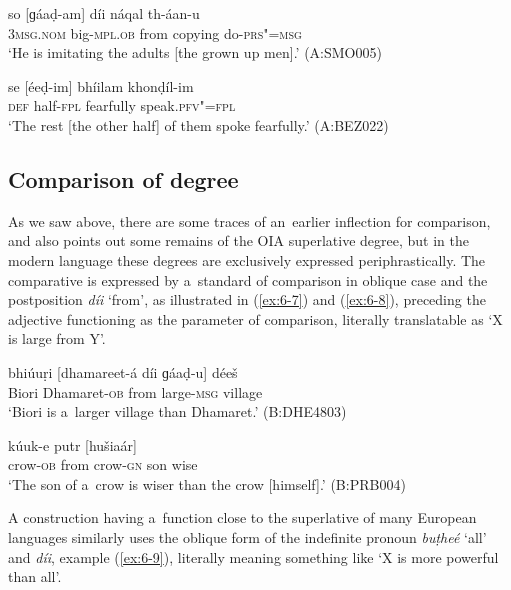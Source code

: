 {\begin{exe}
\ex
\label{ex:6-5}
\gll so [ɡáaḍ-am] díi náqal th-áan-u \\
\textsc{3msg.nom} big-\textsc{mpl.ob} from copying do-\textsc{prs"=msg} \\
\glt `He is imitating the adults [the grown up men].' (A:SMO005)

\ex
\label{ex:6-6}
\gll se [éeḍ-im] bhíilam khonḍíl-im \\
\textsc{def} half-\textsc{fpl} fearfully speak.\textsc{pfv"=fpl} \\
\glt `The rest [the other half] of them spoke fearfully.' (A:BEZ022)
\end{exe}

\subsection{Comparison of degree}
\label{subsec:6-3-3}

As we saw above, there are some traces of an~earlier inflection for comparison, and \citet[17]{morgenstierne1941} also points out some remains of the OIA superlative degree, but in the modern language these degrees are exclusively expressed periphrastically. The comparative is expressed by a~standard of comparison in oblique case and the postposition \textit{díi} `from', as illustrated in (\ref{ex:6-7}) and (\ref{ex:6-8}), preceding the adjective functioning as the parameter of comparison, literally translatable as `X is large from Y'. 

\begin{exe}
\ex
\label{ex:6-7}
\gll bhiúuṛi [dhamareet-á díi ɡáaḍ-u] déeš \\
Biori Dhamaret-\textsc{ob} from large-\textsc{msg} village \\
\glt `Biori is a~larger village than Dhamaret.' (B:DHE4803)

\ex
\label{ex:6-8}
 kúuk-e putr [hušiaár] \\
crow-\textsc{ob} from crow-\textsc{gn} son wise  \\
\glt `The son of a~crow is wiser than the crow [himself].' (B:PRB004)
\end{exe}

A construction having a~function close to the superlative of many European languages similarly uses the oblique form of the indefinite pronoun \textit{buṭheé} `all' and \textit{díi}, example (\ref{ex:6-9}), literally meaning something like `X is more powerful than all'.

}
